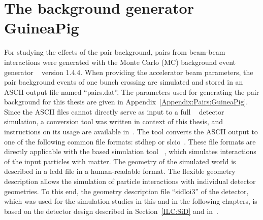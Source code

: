 \section{The background generator GuineaPig}
\label{PairBkg:GuineaPig}
For studying the effects of the pair background, \positron\electron pairs from beam-beam interactions were generated with the Monte Carlo (MC) background event generator \guineapig~\cite{Schulte:1997nga} version 1.4.4. 
When providing the accelerator beam parameters, the pair background events of one bunch crossing are simulated and stored in an ASCII output file named ``pairs.dat''.
The parameters used for generating the pair background for this thesis are given in Appendix~\ref{Appendix:Pairs:GuineaPig}. 
\\Since the ASCII files cannot directly serve as input to a full \geant~\cite{geant_ref,geant_ref2} detector simulation, a conversion tool was written in context of this thesis, and instructions on its usage are available in~\cite{Confluence}. 
The tool converts the ASCII output to one of the following common file formats: stdhep or slcio~\cite{LCIO}.
These file formats are directly applicable with the \geant based simulation tool \slic~\cite{Graf:2006ei}, which simulates interactions of the input particles with matter.
The geometry of the simulated world is described in a lcdd file in a human-readable format.
The flexible geometry description allows the simulation of particle interactions with individual detector geometries.
To this end, the geometry description file ``sidloi3'' of the \sid detector, which was used for the simulation studies in this and in the following chapters, is based on the detector design described in Section~\ref{ILC:SiD} and in~\cite[p. 69 ff]{TDR4}.

